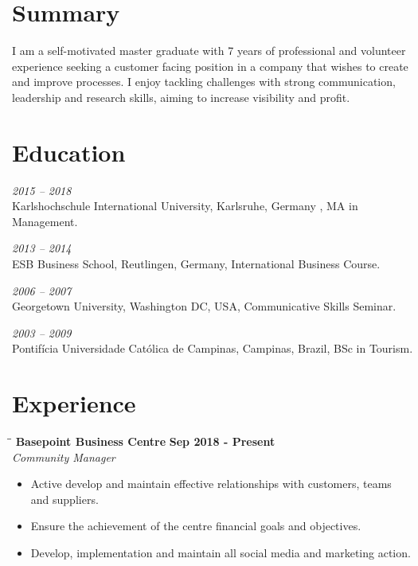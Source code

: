 \documentclass[margin]{res}
\begin{document}
  

\address{Brighton, UK \\ samyracsalek@gmail.com \\ Phone: +44 7305 759339 \\ Post Code: BN1 3TP }
                        
\begin{resume}                        

\section{Summary}

I am a self-motivated master graduate with 7 years of professional and
volunteer experience seeking a customer facing position in a company that
wishes to create and improve processes. I enjoy tackling challenges with
strong communication, leadership and research skills, aiming to increase
visibility and profit.

\section{Education}
\textit{2015 – 2018}\\
Karlshochschule International University, Karlsruhe, Germany , MA in Management.

\textit{2013 – 2014}\\
ESB Business School, Reutlingen, Germany, International Business Course.

\textit{2006 – 2007}\\
Georgetown University, Washington DC, USA, Communicative Skills Seminar.

\textit{2003 – 2009}\\
Pontifícia Universidade Católica de Campinas, Campinas, Brazil, BSc in Tourism.

\section{Experience}

\vspace{-0.1in}
    \begin{tabbing}
        \hspace{2.3in}\= \hspace{1.7in}\= \kill
        \textbf{Basepoint Business Centre} \>\>\textbf{Sep 2018 - Present}\\
        \textit{Community Manager}\\        
    \end{tabbing}\vspace{-20pt}
    \vspace{2mm}
    \begin{itemize}
        \item Active develop and maintain effective relationships with customers, teams and suppliers.
        \item Ensure the achievement of the centre financial goals and objectives.
        \item Develop, implementation and maintain all social media and marketing action.   
    \end{itemize}


\end{resume}
\end{document}
